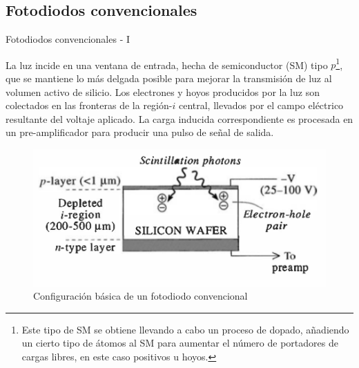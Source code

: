 \documentclass[a4paper,10pt]{beamer}
\begin{document}
\subsection{Fotodiodos convencionales}

\begin{frame}{Fotodiodos convencionales - I}

\begin{justify}
La luz incide en una ventana de entrada, hecha de semiconductor (SM) tipo $p$\footnote{Este 
tipo de SM se obtiene llevando a cabo un proceso de dopado, añadiendo un 
cierto tipo de átomos al SM para aumentar el número de portadores de cargas libres, 
en este caso positivos u hoyos.}, que se mantiene lo más delgada posible para mejorar 
la transmisión de luz al volumen activo de silicio. Los electrones y hoyos producidos 
por la luz son colectados en las fronteras de la región-$i$ central, llevados por 
el campo eléctrico resultante del voltaje aplicado. La carga inducida correspondiente 
es procesada en un pre-amplificador para producir una pulso de señal de salida.
\end{justify}

\begin{figure}
 \center 
 \includegraphics[scale=0.42]{fig40}
 \caption{Configuración básica de un fotodiodo convencional}
\end{figure}

\end{frame}
\end{document}
